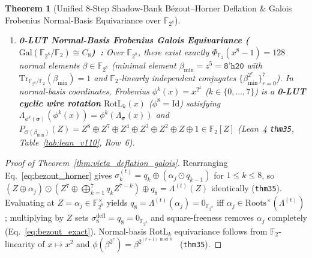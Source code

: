 \documentclass[10pt,twocolumn]{article}
\theoremstyle{spectralthm}
\newtheorem{theorem}{Theorem}[section]
\begin{document}
\begin{theorem}[Unified 8-Step Shadow-Bank B\'{e}zout--Horner Deflation \& Galois Frobenius Normal-Basis Equivariance over $\mathbb{F}_{2^8}$]
\begin{enumerate}
  \item[(ii)] \textbf{0-LUT Normal-Basis Frobenius Galois Equivariance ($\mathrm{Gal}(\mathbb{F}_{2^8}/\mathbb{F}_2) \cong C_8$)~\cite{mullin1989optimal,diamond2025binius}:} Over $\mathbb{F}_{2^8}$, there exist exactly $\Phi_{\mathbb{F}_2}(x^8 - 1) = 128$ normal elements $\beta \in \mathbb{F}_{2^8}$ (minimal element $\beta_{\min} = z^5 = \texttt{8'h20}$ with $\mathrm{Tr}_{\mathbb{F}_{2^8}/\mathbb{F}_2}(\beta_{\min}) = 1$ and $\mathbb{F}_2$-linearly independent conjugates $\{\beta_{\min}^{2^r}\}_{r=0}^7$). In normal-basis coordinates, Frobenius $\phi^k(x) = x^{2^k}$ ($k \in \{0,\ldots,7\}$) is a \textbf{0-LUT cyclic wire rotation} $\mathrm{RotL}_k(x)$ ($\phi^8 = \mathrm{Id}$) satisfying $\Lambda_{\phi^k(\boldsymbol{\sigma})}(\phi^k(x)) = \phi^k(\Lambda_{\boldsymbol{\sigma}}(x))$ and $P_{\mathcal{O}(\beta_{\min})}(Z) = Z^8 \oplus Z^7 \oplus Z^4 \oplus Z^3 \oplus Z^2 \oplus Z \oplus 1 \in \mathbb{F}_2[Z]$ (Lean~4 \texttt{thm35}, Table~\ref{tab:lean_v110}, Row~6).
\end{enumerate}
\end{theorem}
\begin{proof}[Proof of Theorem~\ref{thm:vieta_deflation_galois}]
Rearranging Eq.~\eqref{eq:bezout_horner} gives $\sigma_k^{(t)} = q_k \oplus (\alpha_j \odot q_{k-1})$ for $1 \le k \le 8$, so $(Z \oplus \alpha_j)\odot(Z^7 \oplus \bigoplus_{k=1}^7 q_k Z^{7-k}) \oplus q_8 = \Lambda^{(t)}(Z)$ identically (\texttt{thm35}). Evaluating at $Z = \alpha_j \in \mathbb{F}_{2^8}^\times$ yields $q_8 = \Lambda^{(t)}(\alpha_j) = 0_{\mathbb{F}_{2^8}}$ iff $\alpha_j \in \mathrm{Roots}^\times(\Lambda^{(t)})$; multiplying by $Z$ sets $\sigma_8^{\mathrm{defl}} = q_8 = 0_{\mathbb{F}_{2^8}}$ and square-freeness removes $\alpha_j$ completely (Eq.~\eqref{eq:bezout_exact}). Normal-basis $\mathrm{RotL}_k$ equivariance follows from $\mathbb{F}_2$-linearity of $x \mapsto x^2$ and $\phi(\beta^{2^r}) = \beta^{2^{(r+1)\bmod 8}}$~\cite{mullin1989optimal} (\texttt{thm35}).
\end{proof}
\end{document}
